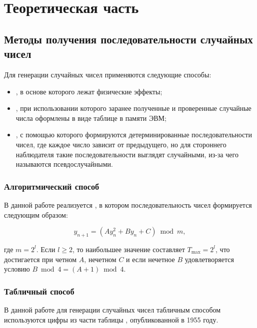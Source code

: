 \chapter{Теоретическая часть}

\section{Методы получения последовательности случайных чисел}

Для генерации случайных чисел применяются следующие способы:
\begin{itemize}
    \item {}, в основе которого лежат физические эффекты;
    \item {}, при использовании которого заранее полученные и
        проверенные случайные числа оформлены в виде таблице в памяти ЭВМ;
    \item {}, с помощью которого формируются
        детерминированные последовательности чисел, где каждое число зависит от
        предыдущего, но для стороннего наблюдателя такие последовательности
        выглядят случайными, из-за чего называются псевдослучайными.
\end{itemize}

\subsection{Алгоритмический способ}

В данной работе реализуется , в котором
последовательность чисел формируется следующим образом:

\begin{equation}
    y_{n+1} = (Ay_n^2 + By_n + C) \bmod m,
\end{equation}

где $m = 2^l$. Если $l \geq 2$, то наибольшее значение составляет $T_{\max} =
2^l$, что достигается при четном $A$, нечетном $C$ и если нечетное $B$
удовлетворяется условию $B \bmod 4 = (A + 1) \bmod 4$.


\subsection{Табличный способ}

В данной работе для генерации случайных чисел табличным способом используются
цифры из части таблицы , опубликованной в 1955 году.

